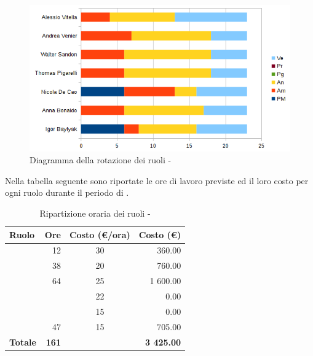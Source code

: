 \documentclass[12pt,a4paper]{article}
\begin{document}
\begin{center}
	\begin{figure}[H]
		\centering
		\includegraphics[width=\textwidth]{../img/diagrammaBarreAnalisiRotazioneRuoli.png}
		\caption{Diagramma della rotazione dei ruoli - \FA{}}
	\end{figure}
\end{center}

\newpage
{}
Nella tabella seguente sono riportate le ore di lavoro previste ed il loro costo per ogni ruolo durante il periodo di \FA.

\begin{table}[H]
	\begin{center}
		\begin{tabular}{l r c r}
			\toprule
			\textbf{Ruolo}	& \textbf{Ore} & \textbf{Costo (\euro/ora)}	& \textbf{Costo (\euro)} \\
			\midrule
			\midrule
			\RE{} & 12 & 30 & 360.00\\
			\midrule
			\AM{} & 38 & 20 & 760.00\\ 
			\midrule
			\AN{} & 64 & 25 & 1 600.00\\ 
			\midrule
			\PG{} & & 22 & 0.00\\ 
			\midrule
			\PR{} & & 15 & 0.00\\ 
			\midrule
			\VR{} & 47 & 15 & 705.00\\ 
			\midrule
			\textbf{Totale} & \textbf{161} &  & \textbf{3 425.00}\\
			\bottomrule
		\end{tabular}
		\caption{Ripartizione oraria dei ruoli - \FA{}}
	\end{center}
\end{table}
\end{document}
